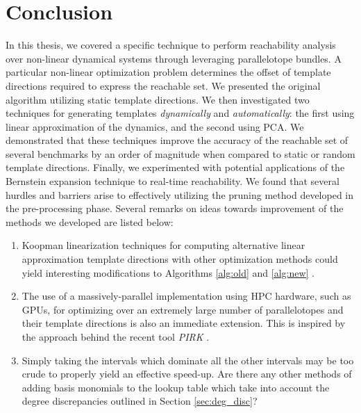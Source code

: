 \chapter{Conclusion}
\label{chap:conclusion}
In this thesis, we covered a specific technique to perform reachability analysis over non-linear dynamical systems through leveraging parallelotope bundles. A particular non-linear optimization problem determines the offset of template directions required to express the reachable set.
%
We presented the original algorithm utilizing static template directions.
%
We then investigated two techniques for generating templates \emph{dynamically} and \emph{automatically}: the first using linear approximation of the dynamics, and the second using PCA.
%
We demonstrated that these techniques improve the accuracy of the reachable set of several benchmarks by an order of magnitude when compared to static or random template directions.
%
Finally, we experimented with potential applications of the Bernstein expansion technique to real-time reachability. We found that several hurdles and barriers arise to effectively utilizing the pruning method developed in the pre-processing phase.
%
Several remarks on ideas towards improvement of the methods we developed are listed below:
\begin{enumerate}
  \item Koopman linearization techniques for computing alternative linear approximation template directions with other optimization methods could yield interesting modifications to Algorithms \ref{alg:old} and \ref{alg:new} \cite{bak2021reachability}.

  \item The use of a massively-parallel implementation using HPC hardware, such as GPUs, for optimizing over an extremely large number of parallelotopes and their template directions is also an immediate extension. This is inspired by the approach behind the recent tool \emph{PIRK} \cite{devonport2020pirk}.

  \item Simply taking the intervals which dominate all the other intervals may be too crude to properly yield an effective speed-up. Are there any other methods of adding basis monomials to the lookup table which take into account the degree discrepancies outlined in Section \ref{sec:deg_disc}?
\end{enumerate}

%
